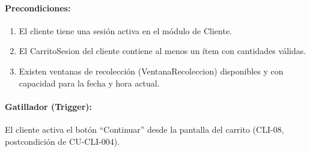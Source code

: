 \paragraph{Precondiciones:}
\begin{enumerate}
    \item[I.] El cliente tiene una sesión activa en el módulo de Cliente.
    \item[II.] El CarritoSesion del cliente contiene al menos un ítem con cantidades válidas.
    \item[III.] Existen ventanas de recolección (VentanaRecoleccion) disponibles y con capacidad para la fecha y hora actual.
\end{enumerate}

\paragraph{Gatillador (Trigger):} El cliente activa el botón ``Continuar'' desde la pantalla del carrito (CLI-08, postcondición de CU-CLI-004).

